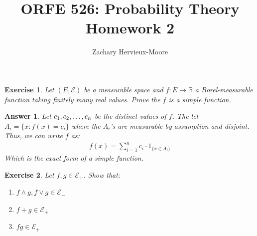 \documentclass[12pt]{article}
\title{ORFE 526: Probability Theory \\ Homework 2}
\author{Zachary Hervieux-Moore}
\date{\displaydate{date}}
\theoremstyle{colon}
\newtheorem{exercise}{Exercise}
\newtheorem*{answer}{Answer}
\begin{document}
\maketitle

\clearpage

\begin{exercise}
  Let $(E, \mathcal{E})$ be a measurable space and $f: E \rightarrow \mathbb{R}$ a Borel-measurable function taking finitely many real values. Prove the $f$ is a simple function.
\end{exercise}

\begin{answer}
  Let $c_1, c_2,\mathellipsis, c_n$ be the distinct values of $f$. The let $A_i = \{ x: f(x) = c_i \}$ where the $A_i$'s are measurable by assumption and disjoint. Thus, we can write $f$ as:
  \begin{gather*}
    f(x) = \sum\limits_{i = 1}^n c_i \cdot 1_{\{ x \in A_i \}}
  \end{gather*}
  Which is the exact form of a simple function.
\end{answer}

\clearpage

\begin{exercise}
  Let $f, g \in \mathcal{E}_+$. Show that:
  \begin{enumerate}[label=\alph*)]
    \item $f \land g, f \lor g \in \mathcal{E}_+$
    \item $f + g \in \mathcal{E}_+$
    \item $fg \in \mathcal{E}_+$
  \end{enumerate}
\end{exercise}
\end{document}
